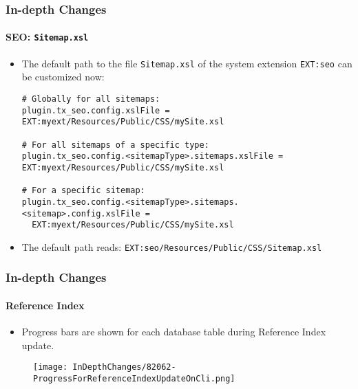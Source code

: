 \begin{frame}[fragile]
	\frametitle{In-depth Changes}
	\framesubtitle{SEO: \texttt{Sitemap.xsl}}

	\lstset{basicstyle=\tiny\ttfamily}

	\begin{itemize}
		\item The default path to the file \texttt{Sitemap.xsl} of the system extension
			\texttt{EXT:seo} can be customized now:
\begin{lstlisting}
# Globally for all sitemaps:
plugin.tx_seo.config.xslFile = EXT:myext/Resources/Public/CSS/mySite.xsl

# For all sitemaps of a specific type:
plugin.tx_seo.config.<sitemapType>.sitemaps.xslFile = EXT:myext/Resources/Public/CSS/mySite.xsl

# For a specific sitemap:
plugin.tx_seo.config.<sitemapType>.sitemaps.<sitemap>.config.xslFile =
  EXT:myext/Resources/Public/CSS/mySite.xsl
\end{lstlisting}

		\item The default path reads:\newline
			\smaller
				\texttt{EXT:seo/Resources/Public/CSS/Sitemap.xsl}
			\normalsize

	\end{itemize}

\end{frame}


\begin{frame}[fragile]
	\frametitle{In-depth Changes}
	\framesubtitle{Reference Index}

	\lstset{basicstyle=\tiny\ttfamily}

	\begin{itemize}
		\item Progress bars are shown for each database table during Reference Index update.
	\end{itemize}

	\begin{figure}
		\texttt{[image: InDepthChanges/82062-ProgressForReferenceIndexUpdateOnCli.png]}
	\end{figure}

\end{frame}

